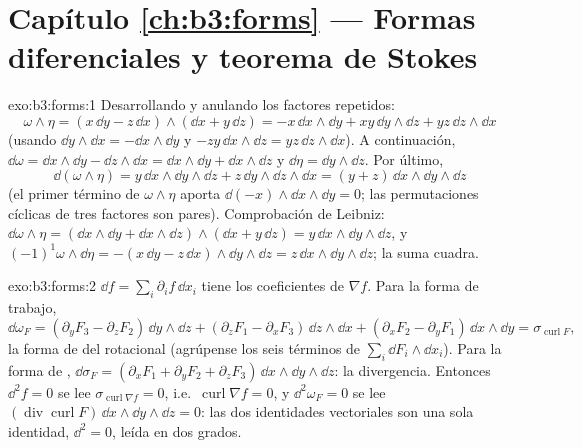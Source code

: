 \section*{Capítulo \ref{ch:b3:forms} --- Formas diferenciales y
teorema de Stokes}

\begin{solution}{exo:b3:forms:1}
Desarrollando y anulando los factores repetidos:
\[
\omega\wedge\eta = (x\,\dd y - z\,\dd x)\wedge(\dd x +
y\,\dd z)
= -x\,\dd x\wedge\dd y + xy\,\dd y\wedge\dd z +
yz\,\dd z\wedge\dd x
\]
(usando $\dd y\wedge\dd x = -\dd x\wedge\dd y$ y $-zy\,\dd
x\wedge\dd z = yz\,\dd z\wedge\dd x$). A continuación, $\dd\omega =
\dd x\wedge\dd y - \dd z\wedge\dd x = \dd x\wedge\dd y +
\dd x\wedge\dd z$ y $\dd\eta = \dd y\wedge\dd z$. Por último,
\[
\dd(\omega\wedge\eta) = y\,\dd x\wedge\dd y\wedge\dd z +
z\,\dd y\wedge\dd z\wedge\dd x = (y + z)\,\dd x\wedge\dd
y\wedge\dd z
\]
(el primer término de $\omega\wedge\eta$ aporta $\dd(-x)
\wedge\dd x\wedge\dd y = 0$; las permutaciones cíclicas de tres factores
son pares). Comprobación de Leibniz: $\dd\omega\wedge\eta =
(\dd x\wedge\dd y + \dd x\wedge\dd z)\wedge(\dd x + y\,\dd
z) = y\,\dd x\wedge\dd y\wedge\dd z$, y
$(-1)^1\omega\wedge\dd\eta = -(x\,\dd y - z\,\dd
x)\wedge\dd y\wedge\dd z = z\,\dd x\wedge\dd y\wedge\dd z$;
la suma cuadra.
\end{solution}

\begin{solution}{exo:b3:forms:2}
$\dd f = \sum_i\partial_if\,\dd x_i$ tiene los coeficientes de
$\nabla f$. Para la forma de trabajo,
\[
\dd\omega_F = (\partial_yF_3 - \partial_zF_2)\,\dd y\wedge\dd
z + (\partial_zF_1 - \partial_xF_3)\,\dd z\wedge\dd x +
(\partial_xF_2 - \partial_yF_1)\,\dd x\wedge\dd y =
\sigma_{\operatorname{curl}F},
\]
la forma de  del rotacional (agrúpense los seis términos de
$\sum_i\dd F_i\wedge\dd x_i$). Para la forma de ,
$\dd\sigma_F = (\partial_xF_1 + \partial_yF_2 +
\partial_zF_3)\,\dd x\wedge\dd y\wedge\dd z$: la divergencia. Entonces
$\dd^2f = 0$ se lee
$\sigma_{\operatorname{curl}\nabla f} = 0$, i.e.\
$\operatorname{curl}\nabla f = 0$, y $\dd^2\omega_F = 0$ se lee
$(\operatorname{div}\operatorname{curl}F)\,\dd
x\wedge\dd y\wedge\dd z = 0$: las dos identidades vectoriales son una
sola identidad, $\dd^2 = 0$, leída en dos grados.
\end{solution}


